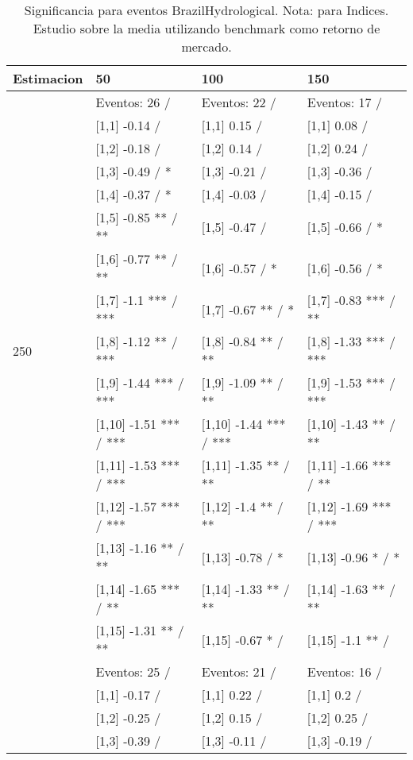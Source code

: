 \begin{table}

\caption{Significancia para eventos BrazilHydrological. Nota: para Indices. Estudio sobre la media utilizando benchmark como retorno de mercado.}
\centering
\begin{tabular}[t]{llll}
\toprule
Estimacion & 50 & 100 & 150\\
\midrule
 & Eventos:  26 / & Eventos:  22 / & Eventos:  17 /\\
 & {}[1,1] -0.14  / & {}[1,1] 0.15  / & {}[1,1] 0.08  /\\
 & {}[1,2] -0.18  / & {}[1,2] 0.14  / & {}[1,2] 0.24  /\\
 & {}[1,3] -0.49  / * & {}[1,3] -0.21  / & {}[1,3] -0.36  /\\
 & {}[1,4] -0.37  / * & {}[1,4] -0.03  / & {}[1,4] -0.15  /\\
\addlinespace
 & {}[1,5] -0.85 ** / ** & {}[1,5] -0.47  / & {}[1,5] -0.66  / *\\
 & {}[1,6] -0.77 ** / ** & {}[1,6] -0.57  / * & {}[1,6] -0.56  / *\\
 & {}[1,7] -1.1 *** / *** & {}[1,7] -0.67 ** / * & {}[1,7] -0.83 *** / **\\
250 & {}[1,8] -1.12 ** / *** & {}[1,8] -0.84 ** / ** & {}[1,8] -1.33 *** / ***\\
 & {}[1,9] -1.44 *** / *** & {}[1,9] -1.09 ** / ** & {}[1,9] -1.53 *** / ***\\
\addlinespace
 & {}[1,10] -1.51 *** / *** & {}[1,10] -1.44 *** / *** & {}[1,10] -1.43 ** / **\\
 & {}[1,11] -1.53 *** / *** & {}[1,11] -1.35 ** / ** & {}[1,11] -1.66 *** / **\\
 & {}[1,12] -1.57 *** / *** & {}[1,12] -1.4 ** / ** & {}[1,12] -1.69 *** / ***\\
 & {}[1,13] -1.16 ** / ** & {}[1,13] -0.78  / * & {}[1,13] -0.96 * / *\\
 & {}[1,14] -1.65 *** / ** & {}[1,14] -1.33 ** / ** & {}[1,14] -1.63 ** / **\\
\addlinespace
 & {}[1,15] -1.31 ** / ** & {}[1,15] -0.67 * / & {}[1,15] -1.1 ** /\\
 & Eventos:  25 / & Eventos:  21 / & Eventos:  16 /\\
 & {}[1,1] -0.17  / & {}[1,1] 0.22  / & {}[1,1] 0.2  /\\
 & {}[1,2] -0.25  / & {}[1,2] 0.15  / & {}[1,2] 0.25  /\\
 & {}[1,3] -0.39  / & {}[1,3] -0.11  / & {}[1,3] -0.19  /\\

\end{tabular}
\end{table}
